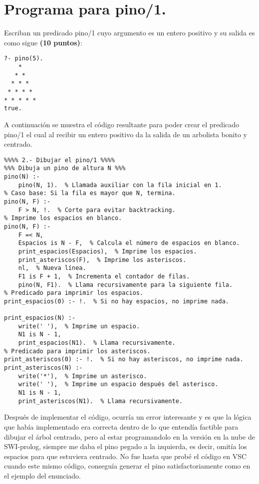 \documentclass[11pt, letterpaper]{article}
\begin{document}
\newpage

\section{Programa para pino/1.}

Escriban un predicado pino/1 cuyo argumento es un entero positivo y su salida es como sigue \textbf{(10 puntos)}:

\begin{lstlisting}
?- pino(5).
    * 
   * *
  * * *
 * * * *
* * * * *
true.
\end{lstlisting}

A continuación se muestra el código resultante para poder crear el predicado pino/1 el cual al recibir un entero positivo da la salida de un arbolista bonito y centrado.

\begin{lstlisting}
%%%% 2.- Dibujar el pino/1 %%%%
%%% Dibuja un pino de altura N %%%
pino(N) :-
    pino(N, 1).  % Llamada auxiliar con la fila inicial en 1.
% Caso base: Si la fila es mayor que N, termina.
pino(N, F) :-
    F > N, !.  % Corte para evitar backtracking.
% Imprime los espacios en blanco.
pino(N, F) :-
    F =< N,
    Espacios is N - F,  % Calcula el número de espacios en blanco.
    print_espacios(Espacios),  % Imprime los espacios.
    print_asteriscos(F),  % Imprime los asteriscos.
    nl,  % Nueva línea.
    F1 is F + 1,  % Incrementa el contador de filas.
    pino(N, F1).  % Llama recursivamente para la siguiente fila.
% Predicado para imprimir los espacios.
print_espacios(0) :- !.  % Si no hay espacios, no imprime nada.

print_espacios(N) :-
    write(' '),  % Imprime un espacio.
    N1 is N - 1,
    print_espacios(N1).  % Llama recursivamente.
% Predicado para imprimir los asteriscos.
print_asteriscos(0) :- !.  % Si no hay asteriscos, no imprime nada.
print_asteriscos(N) :-
    write('*'),  % Imprime un asterisco.
    write(' '),  % Imprime un espacio después del asterisco.
    N1 is N - 1,
    print_asteriscos(N1).  % Llama recursivamente.
\end{lstlisting}

Después de implementar el código, ocurría un error interesante y es que la lógica que había implementado era correcta dentro de lo que entendía factible para dibujar el árbol centrado, pero al estar programandolo en la versión en la nube de SWI-prolog, siempre me daba el pino pegado a la izquierda, es decir, omitía los espacios para que estuviera centrado. No fue hasta que probé el código en VSC cuando este mismo código, conseguía generar el pino satisfactoriamente como en el ejemplo del enunciado.
\end{document}
